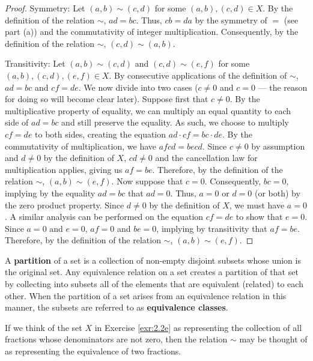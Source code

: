 \documentclass[../main.tex]{subfiles}
\begin{document}
\begin{exercise}
\begin{enumerate}[label={\alph*)},ref={\theexercise\alph*}]
\begin{proof}
            Symmetry: Let $(a,b)\sim(c,d)$ for some $(a,b),(c,d)\in X$. By the definition of the relation $\sim$, $ad=bc$. Thus, $cb=da$ by the symmetry of $=$ (see part (a)) and the commutativity of integer multiplication. Consequently, by the definition of the relation $\sim$, $(c,d)\sim(a,b)$.\par
            Transitivity: Let $(a,b)\sim(c,d)$ and $(c,d)\sim(e,f)$ for some $(a,b),(c,d),(e,f)\in X$. By consecutive applications of the definition of $\sim$, $ad=bc$ and $cf=de$. We now divide into two cases ($c\neq 0$ and $c=0$ --- the reason for doing so will become clear later). Suppose first that $c\neq 0$. By the multiplicative property of equality, we can multiply an equal quantity to each side of $ad=bc$ and still preserve the equality. As such, we choose to multiply $cf=de$ to both sides, creating the equation $ad\cdot cf=bc\cdot de$. By the commutativity of multiplication, we have $afcd=becd$. Since $c\neq 0$ by assumption and $d\neq 0$ by the definition of $X$, $cd\neq 0$ and the cancellation law for multiplication applies, giving us $af=be$. Therefore, by the definition of the relation $\sim$, $(a,b)\sim(e,f)$. Now suppose that $c=0$. Consequently, $bc=0$, implying by the equality $ad=bc$ that $ad=0$. Thus, $a=0$ or $d=0$ (or both) by the zero product property. Since $d\neq 0$ by the definition of $X$, we must have $a=0$. A similar analysis can be performed on the equation $cf=de$ to show that $e=0$. Since $a=0$ and $e=0$, $af=0$ and $be=0$, implying by transitivity that $af=be$. Therefore, by the definition of the relation $\sim$, $(a,b)\sim(e,f)$.
        \end{proof}
    \end{enumerate}
\end{exercise}

\begin{remark}\label{rmk:2.3}
    A \textbf{partition} of a set is a collection of non-empty disjoint subsets whose union is the original set. Any equivalence relation on a set creates a partition of that set by collecting into subsets all of the elements that are equivalent (related) to each other. When the partition of a set arises from an equivalence relation in this manner, the subsets are referred to as \textbf{equivalence classes}.
\end{remark}

\begin{remark}\label{rmk:2.4}
    If we think of the set $X$ in Exercise \ref{exr:2.2e} as representing the collection of all fractions whose denominators are not zero, then the relation $\sim$ may be thought of as representing the equivalence of two fractions.
\end{remark}
\end{document}
